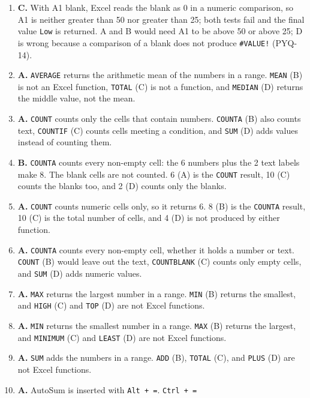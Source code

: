 \begin{enumerate}[label=\textbf{Q\arabic*.}, leftmargin=*]
\item \textbf{C.} With A1 blank, Excel reads the blank as 0 in a numeric
  comparison, so A1 is neither greater than 50 nor greater than 25; both tests
  fail and the final value \texttt{Low} is returned. A and B would need A1 to
  be above 50 or above 25; D is wrong because a comparison of a blank does not
  produce \texttt{\#VALUE!} (PYQ-14).
\item \textbf{A.} \texttt{AVERAGE} returns the arithmetic mean of the numbers
  in a range. \texttt{MEAN} (B) is not an Excel function, \texttt{TOTAL} (C)
  is not a function, and \texttt{MEDIAN} (D) returns the middle value, not the
  mean.
\item \textbf{A.} \texttt{COUNT} counts only the cells that contain numbers.
  \texttt{COUNTA} (B) also counts text, \texttt{COUNTIF} (C) counts cells
  meeting a condition, and \texttt{SUM} (D) adds values instead of counting
  them.
\item \textbf{B.} \texttt{COUNTA} counts every non-empty cell: the 6 numbers
  plus the 2 text labels make 8. The blank cells are not counted. 6 (A) is the
  \texttt{COUNT} result, 10 (C) counts the blanks too, and 2 (D) counts only
  the blanks.
\item \textbf{A.} \texttt{COUNT} counts numeric cells only, so it returns 6.
  8 (B) is the \texttt{COUNTA} result, 10 (C) is the total number of cells,
  and 4 (D) is not produced by either function.
\item \textbf{A.} \texttt{COUNTA} counts every non-empty cell, whether it
  holds a number or text. \texttt{COUNT} (B) would leave out the text,
  \texttt{COUNTBLANK} (C) counts only empty cells, and \texttt{SUM} (D) adds
  numeric values.
\item \textbf{A.} \texttt{MAX} returns the largest number in a range.
  \texttt{MIN} (B) returns the smallest, and \texttt{HIGH} (C) and
  \texttt{TOP} (D) are not Excel functions.
\item \textbf{A.} \texttt{MIN} returns the smallest number in a range.
  \texttt{MAX} (B) returns the largest, and \texttt{MINIMUM} (C) and
  \texttt{LEAST} (D) are not Excel functions.
\item \textbf{A.} \texttt{SUM} adds the numbers in a range. \texttt{ADD} (B),
  \texttt{TOTAL} (C), and \texttt{PLUS} (D) are not Excel functions.
\item \textbf{A.} AutoSum is inserted with \texttt{Alt + =}. \texttt{Ctrl + =}

\end{enumerate}
